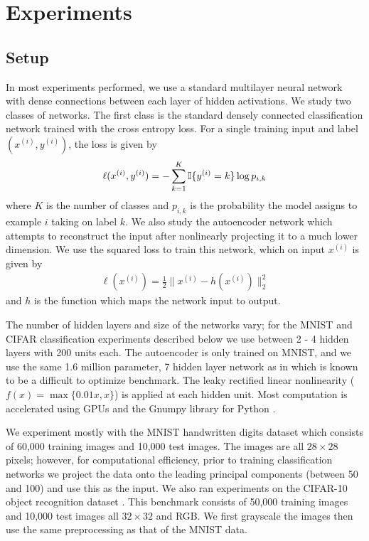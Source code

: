\section{Experiments}

\subsection{Setup}
In most experiments performed, we use a standard multilayer neural network with
dense connections between each layer of hidden activations. We study two
classes of networks. The first class is the standard densely connected
classification network trained with the cross entropy loss. For a single
training input and label $(x^{(i)},y^{(i)})$, the loss is given by
\begin{align}
\ell (x^{(i)},y^{(i)}) = - \sum_{k=1}^K \mathbb{I}\{y^{(i)} = k\} \log p_{i,k}
\end{align}
where $K$ is the number of classes and $p_{i,k}$ is the probability the model
assigns to example $i$ taking on label $k$. We also study the autoencoder
network which attempts to reconstruct the input after nonlinearly projecting it
to a much lower dimension. We use the squared loss to train this network, which
on input $x^{(i)}$ is given by
\begin{align}
\ell(x^{(i)}) = \frac{1}{2} \|x^{(i)} - h(x^{(i)})\|_2^2
\end{align}
and $h$ is the function which maps the network input to output.

The number of hidden layers and size of the networks vary; for the MNIST and
CIFAR classification experiments described below we use between 2 - 4 hidden
layers with 200 units each. The autoencoder is only trained on MNIST, and we
use the same 1.6 million parameter, 7 hidden layer network as in
\cite{hinton_2006} which is known to be a difficult to optimize benchmark. The
leaky rectified linear nonlinearity ($f(x) = \max\{0.01x,x\}$) is applied at
each hidden unit.  Most computation is accelerated using GPUs and the Gnumpy
library for Python \cite{tielemen_2010}.

We experiment mostly with the MNIST handwritten digits dataset which consists
of 60,000 training images and 10,000 test images. The images are all
$28\times28$ pixels; however, for computational efficiency, prior to training
classification networks we project the data onto the leading principal
components (between 50 and 100) and use this as the input. We also ran
experiments on the CIFAR-10 object recognition dataset \cite{krizhevsky_2009}.
This benchmark consists of 50,000 training images and 10,000 test images all
$32 \times 32$ and RGB. We first grayscale the images then use the same
preprocessing as that of the MNIST data.

